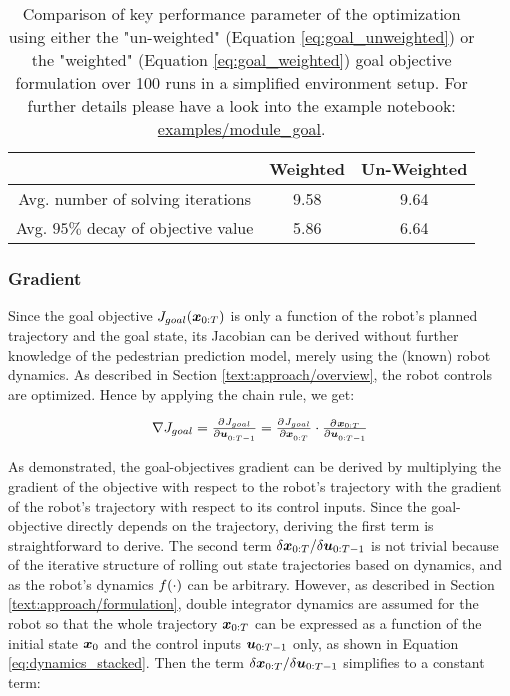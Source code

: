 \begin{table}[!ht]
\begin{center}
\begin{tabular}{c|c|c}
 & Weighted & Un-Weighted \\
\hline
Avg. number of solving iterations & 9.58 & 9.64 \\
\hline
Avg. $95 \%$ decay of objective value & 5.86 & 6.64 \\
\end{tabular}
\caption{Comparison of key performance parameter of the optimization using either the "un-weighted" (Equation \ref{eq:goal_unweighted}) or the "weighted" (Equation  \ref{eq:goal_weighted}) goal objective formulation over 100 runs in a simplified environment setup. For further details please have a look into the example notebook: \href{https://github.com/simon-schaefer/mantrap/blob/master/examples/module_goal.ipynb}{examples/module\_goal}.}
\label{table:goal_horizon_weighting}
\end{center}
\end{table}

\subsubsection{Gradient}
Since the goal objective $J_{goal}(\boldsymbol{x}_{0:T})$ is only a function of the robot's planned trajectory and the goal state, its Jacobian can be derived without further knowledge of the pedestrian prediction model, merely using the (known) robot dynamics. As described in Section \ref{text:approach/overview}, the robot controls are optimized. Hence by applying the chain rule, we get:

\begin{equation}
\nabla J_{goal} = \pd{J_{goal}}{\u_{0:T-1}} = \pd{J_{goal}}{\x_{0:T}} \cdot \pd{\x_{0:T}}{\u_{0:T-1}}
\end{equation}

As demonstrated, the goal-objectives gradient can be derived by multiplying the gradient of the objective with respect to the robot's trajectory with the gradient of the robot's trajectory with respect to its control inputs. Since the goal-objective directly depends on the trajectory, deriving the first term is straightforward to derive. The second term $\delta \boldsymbol{x}_{0:T} / \delta \boldsymbol{u}_{0:T-1}$ is not trivial because of the iterative structure of rolling out state trajectories based on dynamics, and as the robot's dynamics $f(\cdot)$ can be arbitrary. However, as described in Section \ref{text:approach/formulation}, double integrator dynamics are assumed for the robot so that the whole trajectory $\boldsymbol{x}_{0:T}$ can be expressed as a function of the initial state $\boldsymbol{x}_0$ and the control inputs $\boldsymbol{u}_{0:T-1}$ only, as shown in Equation \ref{eq:dynamics_stacked}. Then the term $\delta \boldsymbol{x}_{0:T} / \delta \boldsymbol{u}_{0:T-1}$ simplifies to a constant term:

